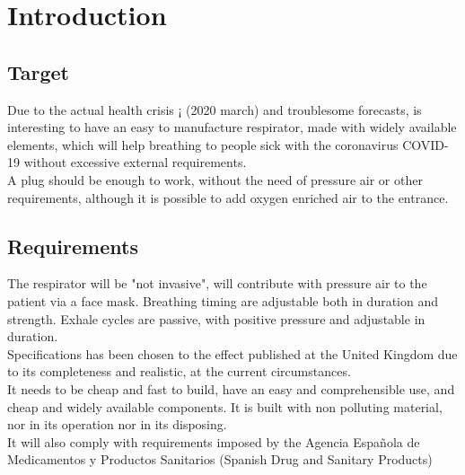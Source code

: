 \section{Introduction}
\subsection{Target}
    Due to the actual health crisis ¡ (2020 march) and troublesome forecasts, is interesting to have an easy to manufacture respirator, made with widely available elements, which will help breathing to people sick with the coronavirus COVID-19 without excessive external requirements.\\
    
    A plug should be enough to work, without the need of pressure air or other requirements, although it is possible to add oxygen enriched air to the entrance.
    
\subsection{Requirements}
    The respirator will be "not invasive", will contribute with pressure air to the patient via a face mask. Breathing timing are adjustable both in duration and strength. Exhale cycles are passive, with positive pressure and adjustable in duration.\\
    
    Specifications has been chosen to the effect published at the United Kingdom \cite{MHRA} due to its completeness and realistic, at the current circumstances.\\
    
    It needs to be cheap and fast to build, have an easy and comprehensible use, and cheap and widely available components. It is built with non polluting material, nor in its operation nor in its disposing.\\
    
    It will also comply with requirements imposed by the Agencia Española de Medicamentos y Productos Sanitarios (Spanish Drug and Sanitary Products)
    
